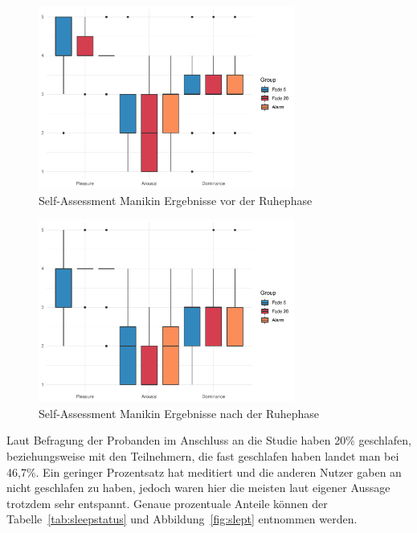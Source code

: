 \begin{figure}[H]
	\centering
	\includegraphics[width=0.75\textwidth]{./_StudyResults/SAMpre}
	\caption{Self-Assessment Manikin Ergebnisse vor der Ruhephase}
	\label{fig:samPre}
\end{figure}
\begin{figure}[H]
	\centering
	\includegraphics[width=0.75\textwidth]{./_StudyResults/SAMpost}
	\caption{Self-Assessment Manikin Ergebnisse nach der Ruhephase}
	\label{fig:samPost}
\end{figure}


Laut Befragung der Probanden im Anschluss an die Studie haben 20\% geschlafen, beziehungsweise mit den Teilnehmern, die fast geschlafen haben landet man bei 46,7\%. Ein geringer Prozentsatz hat meditiert und die anderen Nutzer gaben an nicht geschlafen zu haben, jedoch waren hier die meisten laut eigener Aussage trotzdem sehr entspannt. Genaue prozentuale Anteile können der Tabelle~\ref{tab:sleepstatus} und Abbildung~\ref{fig:slept} entnommen werden.

